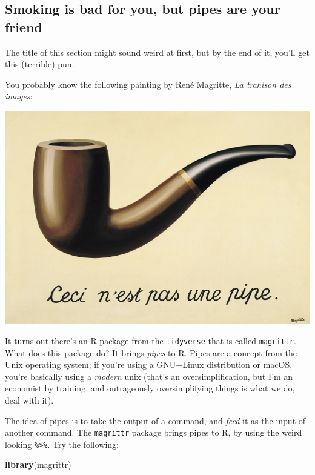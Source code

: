 \documentclass[]{gitbook}
\newenvironment{Shaded}{\begin{snugshade}}{\end{snugshade}}
\newcommand{\KeywordTok}[1]{\textcolor[rgb]{0.13,0.29,0.53}{\textbf{#1}}}
\newcommand{\NormalTok}[1]{#1}
\begin{document}
\hypertarget{smoking-is-bad-for-you-but-pipes-are-your-friend}{%
\subsection{Smoking is bad for you, but pipes are your friend}\label{smoking-is-bad-for-you-but-pipes-are-your-friend}}

The title of this section might sound weird at first, but by the end of it, you'll get this
(terrible) pun.

You probably know the following painting by René Magritte, \emph{La trahison des images}:

\includegraphics[width=9.72in]{assets/pas_une_pipe}

It turns out there's an R package from the \texttt{tidyverse} that is called \texttt{magrittr}. What does this
package do? It brings \emph{pipes} to R. Pipes are a concept from the Unix operating system; if you're
using a GNU+Linux distribution or macOS, you're basically using a \emph{modern} unix (that's an
oversimplification, but I'm an economist by training, and outrageously oversimplifying things is
what we do, deal with it).

The idea of pipes is to take the output of a command, and \emph{feed} it as the input of another
command. The \texttt{magrittr} package brings pipes to R, by using the weird looking \texttt{\%\textgreater{}\%}. Try the
following:

\begin{Shaded}
\begin{Highlighting}[]
\KeywordTok{library}\NormalTok{(magrittr)}
\end{Highlighting}
\end{Shaded}
\end{document}
